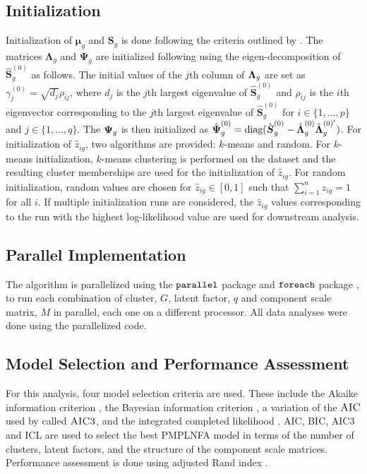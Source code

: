 \documentclass[12pt]{article}
\newcommand{\vecLambda}{\mbox{\boldmath$\Lambda$}}
\newcommand{\matPsi}{\mbox{\boldmath$\Psi$}}
\begin{document}
\subsection{Initialization}
Initialization of $\boldsymbol{\mu}_g$ and $\boldsymbol{S}_g$ is done following the criteria outlined by \citet{Silva2017}. The matrices $\boldsymbol{\Lambda}_g$  and $\boldsymbol{\Psi}_g$ are initialized following \citet{mcnicholas2008} using the eigen-decomposition of $\hat{\boldsymbol{S}}_g^{(0)}$ as follows. The initial values of the $j$th column of $\vecLambda_g$ are set as $\gamma_{j}^{(0)} = \sqrt{d_j}\rho_{ij}$, where $d_j$ is the $j$th largest eigenvalue of $\hat{\boldsymbol{S}}_g^{(0)}$ and $\rho_{ij}$ is the $i$th eigenvector corresponding to the $j$th largest eigenvalue of $\hat{\boldsymbol{S}}_g^{(0)}$ for $i \in \{1, \ldots, p\}$ and $j \in \{1, \ldots, q\}$. The $\matPsi_g$ is then initialized as $\hat{\matPsi}_g^{(0)} = \text{diag}(\hat{\boldsymbol{S}}_g^{(0)}-\hat{\vecLambda}_g^{(0)}\hat{\vecLambda}_g^{(0)^{\prime}})$. For initialization of $\hat{z}_{ig}$, two algorithms are provided: $k$-means and random. For $k$-means initialization, $k$-means clustering is performed on the dataset and the resulting cluster memberships are used for the initialization of $\hat{z}_{ig}$. For random initialization, random values are chosen for $\hat{z}_{ig} \in [0,1]$ such that $\sum_{i=1}^n z_{ig} = 1$ for all $i$. If multiple initialization runs are considered, the $\hat{z}_{ig}$ values corresponding to the run with the highest log-likelihood value are used for downstream analysis.

\subsection{Parallel Implementation}
The algorithm is parallelized using the ${\tt parallel}$ package \citep{r2014} and ${\tt foreach}$ package \citep{foreach2015}, to run each combination of cluster, $G$, latent factor, $q$ and component scale matrix, $M$ in parallel, each one on a different processor. All data analyses were done using the parallelized code. 

\subsection{Model Selection and Performance Assessment}
For this analysis, four model selection criteria are used. These include the Akaike information criterion \citep[$\textsc{AIC}$;][]{akaike1973}, the Bayesian information criterion \citep[$\textsc{BIC}$;][]{schwarz1978}, a variation of the $\textsc{AIC}$ used by \citet{Bozdogan1994} called $\textsc{AIC3}$, and the integrated completed likelihood \citep[$\textsc{ICL}$;][]{biernacki2000}. AIC, BIC, AIC3 and ICL are used to select the best PMPLNFA model in terms of the number of clusters, latent factors, and the structure of the component scale matrices. Performance assessment is done using adjusted Rand index \citep[$\textsc{ARI}$;][]{hubert1985}. 
\end{document}
